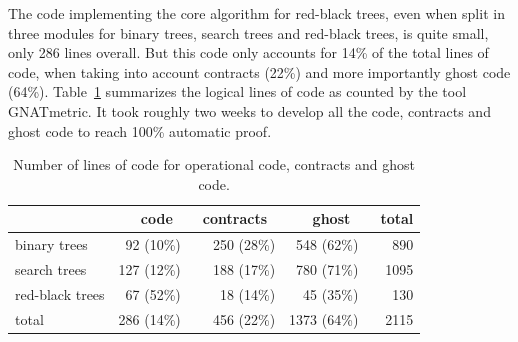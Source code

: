\documentclass{llncs}
\begin{document}
The code implementing the core algorithm for red-black trees, even when split
in three modules for binary trees, search trees and red-black trees, is quite
small, only 286 lines overall. But this code only accounts for 14\% of the
total lines of code, when taking into account contracts (22\%) and more
importantly ghost code (64\%). Table~\ref{tab-sloc} summarizes the logical
lines of code as counted by the tool GNATmetric.
It took roughly two weeks to develop all the code, contracts and ghost code to
reach 100\% automatic proof.

\vspace{-0.5cm}
\begin{table}[ht]
\begin{center}
\begin{tabular}{l||r|r|r|r}
                & ~code~       & ~contracts~  &      ~ghost~  & ~total \\ \hline
binary trees    & 92  (10\%) & 250 (28\%) & 548  (62\%) & 890 \\
search trees    & 127 (12\%) & 188 (17\%) & 780  (71\%) & 1095 \\
red-black trees & 67  (52\%) & 18  (14\%) & 45   (35\%) & 130 \\ \hline
total           & 286 (14\%) & 456 (22\%) & 1373 (64\%) & 2115 \\
\end{tabular}
\vspace*{5mm}
\caption{\label{tab-sloc} Number of lines of code for operational code, contracts and ghost code.}
\vspace*{-10mm}
\end{center}
\end{table}

\end{document}

